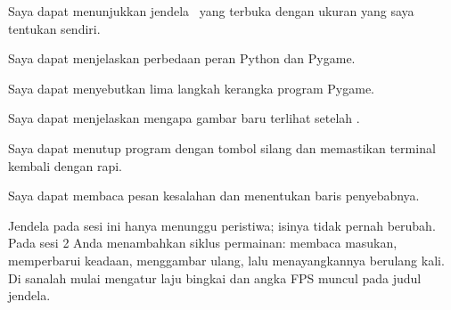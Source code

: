 
\begin{checklistbox}
\begin{checklist}
  \item Saya dapat menunjukkan jendela \NamaPermainan\ yang terbuka dengan
        ukuran yang saya tentukan sendiri.
  \item Saya dapat menjelaskan perbedaan peran Python dan Pygame.
  \item Saya dapat menyebutkan lima langkah kerangka program Pygame.
  \item Saya dapat menjelaskan mengapa gambar baru terlihat setelah
        .
  \item Saya dapat menutup program dengan tombol silang dan memastikan
        terminal kembali dengan rapi.
  \item Saya dapat membaca pesan kesalahan dan menentukan baris penyebabnya.
\end{checklist}
\end{checklistbox}


Jendela pada sesi ini hanya menunggu peristiwa; isinya tidak pernah berubah.
Pada sesi 2 Anda menambahkan siklus permainan: membaca masukan, memperbarui
keadaan, menggambar ulang, lalu menayangkannya berulang kali. Di sanalah
 mulai mengatur laju bingkai dan angka FPS muncul pada judul
jendela.
